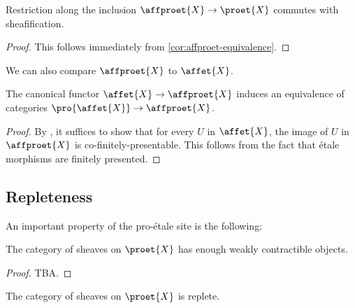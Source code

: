 \begin{corollary}
    Restriction along the inclusion $\affproet{X} \to \proet{X}$ commutes with sheafification.
    \label{cor:affproet-sheafification-commute}%
\end{corollary}

\begin{proof}
    This follows immediately from \ref{cor:affproet-equivalence}.
\end{proof}

We can also compare $\affproet{X}$ to $\affet{X}$.

\begin{proposition}
    The canonical functor $\affet{X} \to \affproet{X}$ induces an equivalence of categories
    $\pro{\affet{X}} \to \affproet{X}$.
    \label{prop:pro-affet-equiv-affproet}
\end{proposition}

\begin{proof}
    By , it suffices to show that for every $U$ in $\affet{X}$, the
    image of $U$ in $\affproet{X}$ is co-finitely-presentable. This follows from the fact
    that étale morphisms are finitely presented.
\end{proof}

\subsection{Repleteness}

An important property of the pro-étale site is the following:

\begin{proposition}
    The category of sheaves on $\proet{X}$ has enough weakly contractible objects.
    \label{prop:proet-wc}
\end{proposition}

\begin{proof}
    TBA.
\end{proof}

\begin{corollary}
    The category of sheaves on $\proet{X}$ is replete.
    \label{prop:proet-replete}
\end{corollary}

